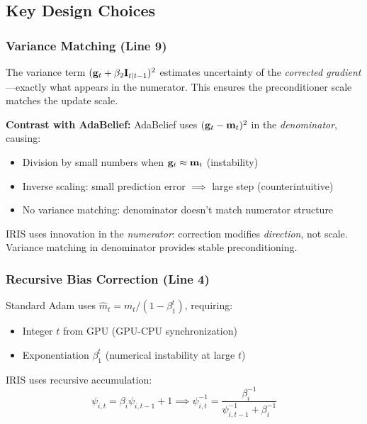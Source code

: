 

\subsection{Key Design Choices}

\subsubsection{Variance Matching (Line 9)}

The variance term $(\mathbf{g}_t + \beta_2 \mathbf{I}_{t|t-1})^2$ estimates uncertainty of the \emph{corrected gradient}---exactly what appears in the numerator. This ensures the preconditioner scale matches the update scale.

\textbf{Contrast with AdaBelief:} AdaBelief uses $(\mathbf{g}_t - \mathbf{m}_t)^2$ in the \emph{denominator}, causing:
\begin{itemize}
    \item Division by small numbers when $\mathbf{g}_t \approx \mathbf{m}_t$ (instability)
    \item Inverse scaling: small prediction error $\implies$ large step (counterintuitive)
    \item No variance matching: denominator doesn't match numerator structure
\end{itemize}

IRIS uses innovation in the \emph{numerator}: correction modifies \emph{direction}, not scale. Variance matching in denominator provides stable preconditioning.

\subsubsection{Recursive Bias Correction (Line 4)}

Standard Adam uses $\hat{m}_t = m_t / (1 - \beta_1^t)$, requiring:
\begin{itemize}
    \item Integer $t$ from GPU (GPU-CPU synchronization)
    \item Exponentiation $\beta_1^t$ (numerical instability at large $t$)
\end{itemize}

IRIS uses recursive accumulation:
\begin{equation}
\psi_{i,t} = \beta_i \psi_{i,t-1} + 1 \implies \psi_{i,t}^{-1} = \frac{\beta_i^{-1}}{\psi_{i,t-1}^{-1} + \beta_i^{-1}}
\end{equation}

